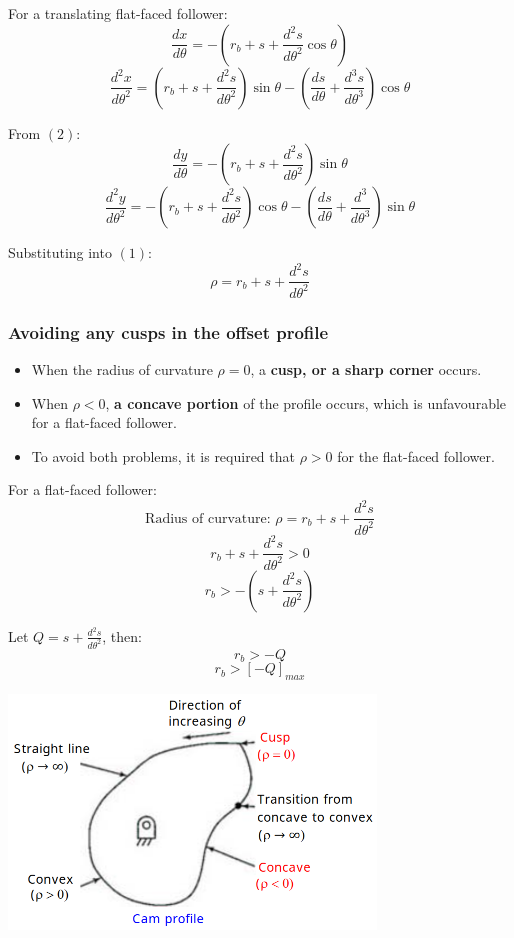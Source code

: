 \documentclass[11pt]{article}
\begin{document}
For a translating flat-faced follower:
\[\frac{dx}{d \theta} = - \left(r_b + s + \frac{d^2 s}{d \theta^2} \cos \theta \right)\]
\[\frac{d^2 x}{d \theta^2} = \left(r_b + s + \frac{d^2 s}{d \theta^2} \right) \sin \theta - \left(\frac{ds}{d \theta} + \frac{d^3 s}{d \theta^3} \right) \cos \theta\]

From \((2)\):
\[\frac{dy}{d \theta} = - \left(r_b + s + \frac{d^2 s}{d \theta^2} \right) \sin \theta\]
\[\frac{d^2 y}{d \theta^2} = - \left(r_b + s + \frac{d^2 s}{d \theta^2} \right) \cos \theta - \left(\frac{ds}{d \theta} + \frac{d^3}{d \theta^3} \right) \sin \theta\]

Substituting into \((1)\):
\[\rho = r_b + s + \frac{d^2 s}{d \theta^2}\]

 \newpage
\subsubsection{Avoiding any cusps in the offset profile}
\label{sec:org513506d}
\begin{itemize}
\item When the radius of curvature \(\rho = 0\), a \textbf{cusp, or a sharp corner} occurs.
\item When \(\rho < 0\), \textbf{a concave portion} of the profile occurs, which is unfavourable for a flat-faced follower.
\item To avoid both problems, it is required that \(\rho > 0\) for the flat-faced follower.
\end{itemize}

For a flat-faced follower:
\[\text{Radius of curvature: } \rho = r_b + s + \frac{d^2 s}{d \theta^2}\]
\[r_b + s + \frac{d^2 s}{d \theta^2} > 0\]
\[r_b > - \left(s + \frac{d^2 s}{d \theta^2} \right)\]

Let \(Q = s + \frac{d^2 s}{d \theta^2}\), then:
\[r_b > -Q\]
\[r_b > [-Q]_{max}\]

\begin{center}
\includegraphics[width=.9\linewidth]{./images/avoiding-cusps-and-concave-profile-diagram.png}
\end{center}
\end{document}
